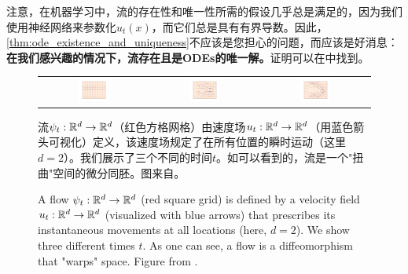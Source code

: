 注意，在机器学习中，流的存在性和唯一性所需的假设几乎总是满足的，因为我们使用神经网络来参数化$u_t(x)$，而它们总是具有有界导数。因此，\cref{thm:ode_existence_and_uniqueness}不应该是您担心的问题，而应该是好消息：\textbf{在我们感兴趣的情况下，流存在且是ODEs的唯一解。}证明可以在\citep{perko2013differential,coddington1956theory}中找到。

\begin{figure}
    \centering
    \begin{tabular}{ccc}
         \includegraphics[width=0.3\textwidth]{fm_guide_assets/flow_1.png} &
         \includegraphics[width=0.3\textwidth]{fm_guide_assets/flow_10.png} &
         \includegraphics[width=0.3\textwidth]{fm_guide_assets/flow_16.png} 
    \end{tabular}
    \caption{A flow $\psi_t:\mathbb R^d\rightarrow \mathbb R^d$ (red square grid) is defined by a velocity field $u_t :\mathbb R^d\rightarrow\mathbb R^d$ (visualized with blue arrows) that prescribes its instantaneous movements at all locations (here, $d=2$). We show three different times $t$. As one can see, a flow is a diffeomorphism that "warps" space. Figure from \citep{lipman2024flow}.}
    \label{fig:flow}
    {流$\psi_t:\mathbb R^d\rightarrow \mathbb R^d$（红色方格网格）由速度场$u_t :\mathbb R^d\rightarrow\mathbb R^d$（用蓝色箭头可视化）定义，该速度场规定了在所有位置的瞬时运动（这里$d=2$）。我们展示了三个不同的时间$t$。如可以看到的，流是一个"扭曲"空间的微分同胚。图来自\citep{lipman2024flow}。}
\end{figure}

